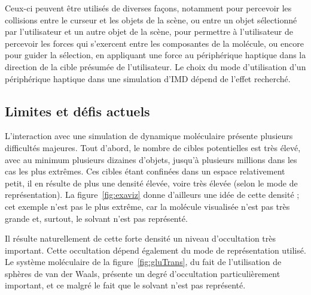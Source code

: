 	Ceux-ci peuvent être utilisés de diverses façons, notamment pour percevoir les \og collisions \fg{} entre le curseur et les objets de la scène, ou entre un objet sélectionné par l'utilisateur et un autre objet de la scène, pour permettre à l'utilisateur de percevoir les forces qui s'exercent entre les composantes de la molécule, ou encore pour guider la sélection, en appliquant une force au périphérique haptique dans la direction de la cible présumée de l'utilisateur. Le choix du mode d'utilisation d'un périphérique haptique dans une simulation d'IMD dépend de l'effet recherché.
	
	\subsection{Limites et défis actuels}
	L'interaction avec une simulation de dynamique moléculaire présente plusieurs difficultés majeures. Tout d'abord, le nombre de cibles potentielles est très élevé, avec au minimum plusieurs dizaines d'objets, jusqu'à plusieurs millions dans les cas les plus extrêmes. Ces cibles étant confinées dans un espace relativement petit, il en résulte de plus une densité élevée, voire très élevée (selon le mode de représentation). La figure~\ref{fig:exaviz} donne d'ailleurs une idée de cette densité ; cet exemple n'est pas le plus extrême, car la molécule visualisée n'est pas très grande et, surtout, le solvant n'est pas représenté.
	
	Il résulte naturellement de cette forte densité un niveau d'occultation très important. Cette occultation dépend également du mode de représentation utilisé. Le système moléculaire de la figure~\ref{fig:gluTrans}, du fait de l'utilisation de sphères de van der Waals, présente un degré d'occultation particulièrement important, et ce malgré le fait que le solvant n'est pas représenté.
	
